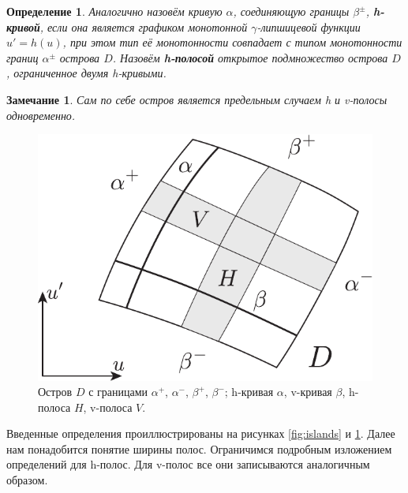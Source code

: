 \documentclass{article}
\newtheorem*{definition}{Определение}
\newtheorem{remark}{Замечание}
\begin{document}
\begin{definition}
	Аналогично назовём кривую $\alpha$, соединяющую границы $\beta^{\pm}$, {\bf h-кривой}, если она является графиком монотонной $\gamma$-липшицевой функции $u' = h(u)$, при этом тип её монотонности совпадает с типом монотонности границ $\alpha^{\pm}$ острова $D$.
	Назовём {\bf h-полосой} открытое подмножество острова $D$, ограниченное двумя \emph{h}-кривыми.
\end{definition}

\begin{remark}
	Сам по себе остров является предельным случаем \emph{h} и \emph{v}-полосы одновременно.
\label{rem:island}
\end{remark}



\begin{figure}[h]
\centering
  \includegraphics[scale = 0.8]{pic/curves and strips}
  \caption{Остров $D$ с границами $\alpha^+$, $\alpha^-$, $\beta^+$, $\beta^-$; h-кривая $\alpha$, v-кривая $\beta$, h-полоса $H$, v-полоса $V$.}
\label{fig:curves-and-strips}
\end{figure}

Введенные определения проиллюстрированы на рисунках \ref{fig:islands} и \ref{fig:curves-and-strips}.
Далее нам понадобится понятие ширины полос.
Ограничимся подробным изложением определений для h-полос.
Для v-полос все они записываются аналогичным образом.
\end{document}

